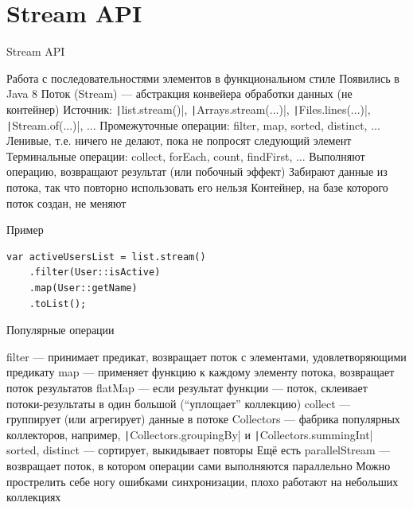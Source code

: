 \documentclass{../../slides-style}
\begin{document}
    \begin{frame}[plain]
        \titlepage
    \end{frame}

    \section{Stream API}

    \begin{frame}{Stream API}
        \begin{outline}
            \1 Работа с последовательностями элементов в функциональном стиле
                \2 Появились в Java 8
            \1 Поток (Stream) --- абстракция конвейера обработки данных (не контейнер)
            \1 Источник: \texttt|list.stream()|, \texttt|Arrays.stream(...)|, \texttt|Files.lines(...)|, \texttt|Stream.of(...)|, ...
            \1 Промежуточные операции: filter, map, sorted, distinct, ...
                \2 Ленивые, т.е. ничего не делают, пока не попросят следующий элемент
            \1 Терминальные операции: collect, forEach, count, findFirst, ...
                \2 Выполняют операцию, возвращают результат (или побочный эффект)
                \2 Забирают данные из потока, так что повторно использовать его нельзя
                    \3 Контейнер, на базе которого поток создан, не меняют
        \end{outline}
    \end{frame}

    \begin{frame}[fragile]{Пример}
        \begin{verbatim}
var activeUsersList = list.stream()
    .filter(User::isActive)
    .map(User::getName)
    .toList();
        \end{verbatim}
    \end{frame}

    \begin{frame}{Популярные операции}
        \begin{outline}
            \1 filter --- принимает предикат, возвращает поток с элементами, удовлетворяющими предикату
            \1 map --- применяет функцию к каждому элементу потока, возвращает поток результатов
                \2 flatMap --- если результат функции --- поток, склеивает потоки-результаты в один большой (\enquote{уплощает} коллекцию)
            \1 collect --- группирует (или агрегирует) данные в потоке
                \2 Collectors --- фабрика популярных коллекторов, например, \texttt|Collectors.groupingBy| и \texttt|Collectors.summingInt|
            \1 sorted, distinct --- сортирует, выкидывает повторы
            \1 Ещё есть parallelStream --- возвращает поток, в котором операции сами выполняются параллельно
                \2 Можно прострелить себе ногу ошибками синхронизации, плохо работают на небольших коллекциях
        \end{outline}
    \end{frame}
\end{document}
